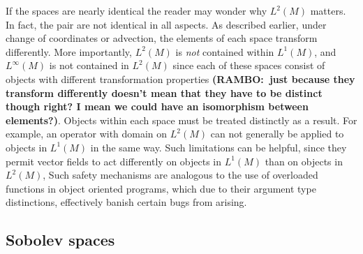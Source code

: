 \documentclass[final,leqno]{siamltex1213}
\newcommand{\ram}[1]{{\normalsize{\textbf{({\color{red}RAMBO:\ }#1)}}}}
\begin{document}
If the spaces are nearly identical the reader may wonder why $L^2(M)$ matters.
In fact, the pair are not identical in all aspects.
As described earlier, under change of coordinates or advection, the elements of each space transform differently.
More importantly, $L^{2}(M)$ is \emph{not} contained within $L^{1}(M)$, and $L^{\infty}(M)$ is not contained in $L^{2}(M)$ since each of these spaces consist of objects with different transformation properties \ram{just because they transform differently doesn't mean that they have to be distinct though right? I mean we could have an isomorphism between elements?}.
Objects within each space must be treated distinctly as a result. 
For example, an operator with domain on $L^{2}(M)$ can not generally be applied to objects in $L^{1}(M)$ in the same way.
Such limitations can be helpful, since they permit vector fields to act differently on objects in $L^{1}(M)$ than on objects in $L^{2}(M)$,
Such safety mechanisms are analogous to the use of overloaded functions in object oriented programs, which due to their argument type distinctions, effectively banish certain bugs from arising.


\subsection{Sobolev spaces}
\label{sec:Sobolev spaces}
\end{document}
